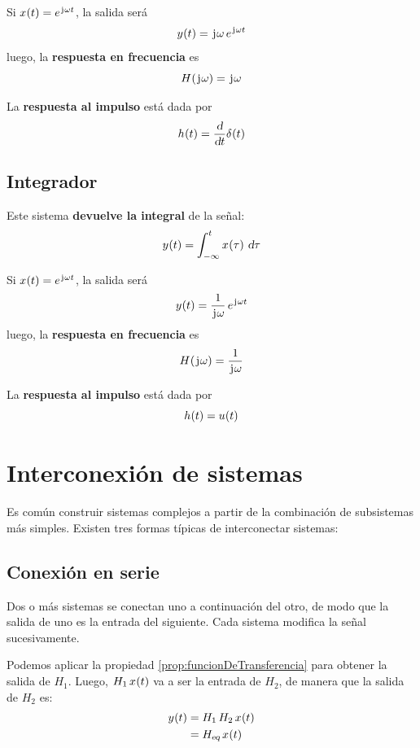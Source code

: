 Si $\fx[x]{t} = \complexExp$, la salida será
\[
    \fx[y]{t} = \iu \omega \, \complexExp
\]
luego, la \textbf{respuesta en frecuencia} es
\[
    \fx[H]{\iu \omega} = \iu \omega
\]

La \textbf{respuesta al impulso} está dada por
\[
    \fx[h]{t} = \frac{\dif}{\dif t} \fx[\delta]{t}
\]

\subsection{Integrador}

Este sistema \textbf{devuelve la integral} de la señal:
\[
    \fx[y]{t} = \int_{-\infty}^{t} \fx[x]{\tau} \, \dif \tau
\]

Si $\fx[x]{t} = \complexExp$, la salida será
\[
    \fx[y]{t} = \frac{1}{\iu \omega} \, \complexExp
\]
luego, la \textbf{respuesta en frecuencia} es
\[
    \fx[H]{\iu \omega} = \frac{1}{\iu \omega}
\]

La \textbf{respuesta al impulso} está dada por
\[
    \fx[h]{t} = \fx[u]{t}
\]

\section{Interconexión de sistemas}
\label{sec:InterconexionDeSistemas}

Es común construir sistemas complejos a partir de la combinación de subsistemas más simples.
Existen tres formas típicas de interconectar sistemas:

\subsection{Conexión en serie}

Dos o más sistemas se conectan uno a continuación del otro, de modo que la salida de uno es la entrada del siguiente.
Cada sistema modifica la señal sucesivamente.

\begin{center}
    \def\svgwidth{0.8\linewidth}
    
\end{center}

Podemos aplicar la propiedad \ref{prop:funcionDeTransferencia} para obtener la salida de $H_1$.
Luego, $H_1 \, \fx[x]{t}$ va a ser la entrada de $H_2$, de manera que la salida de $H_2$ es:
\begin{align*}
    \fx[y]{t}
    & = H_1 \, H_2 \, \fx[x]{t}
    \\
    & = \sub{H}{eq} \, \fx[x]{t}
\end{align*}

